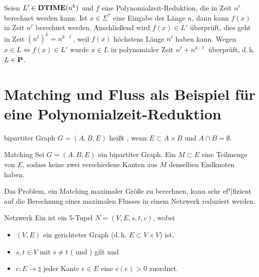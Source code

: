 \begin{Beweis}
    Seien $L' \in \DTIME(n^k)$ und $f$ eine Polynomialzeit-Reduktion, die in
    Zeit $n^\ell$ berechnet werden kann.
    Ist $x \in \Sigma^\ast$ eine Eingabe der Länge $n$, dann
    kann $f(x)$ in Zeit $n^\ell$ berechnet werden.
    Anschließend wird $f(x) \in L'$ überprüft, dies geht in Zeit $(n^\ell)^k = n^{k \cdot \ell}$,
    weil $f(x)$ höchstens Länge $n^\ell$ haben kann.
    Wegen $x \in L \iff f(x) \in L'$ wurde $x \in L$ in
    polynomialer Zeit $n^\ell + n^{k \cdot \ell}$ überprüft, d.\,h. $L \in \P$.
\end{Beweis}

\section{%
    Matching und Fluss als Beispiel für eine Polynomialzeit-Reduktion%
}

\begin{Def}{bipartiter Graph}
    $G = (A, B, E)$ heißt , wenn $E \subset A \times B$
    und $A \cap B = \emptyset$.
\end{Def}

\begin{Def}{Matching}
    Sei $G = (A, B, E)$ ein bipartiter Graph.
    Ein  $M \subset E$ eine Teilmenge von $E$, sodass keine zwei
    verschiedene Kanten aus $M$ denselben Endknoten haben.
\end{Def}

\linie

\begin{Bem}
    Das Problem, ein Matching maximaler Größe zu berechnen,
    kann sehr ef"|fizient auf die Berechnung eines maximalen Flusses in einem Netzwerk
    reduziert werden.
\end{Bem}

\begin{Def}{Netzwerk}
    Ein  ist ein $5$-Tupel $N = (V, E, s, t, c)$, wobei
    \begin{itemize}
        \item
        $(V, E)$ ein gerichteter Graph (d.\,h. $E \subset V \times V$) ist,

        \item
        $s, t \in V$ mit $s \not= t$ ( und ) gilt und

        \item
        $c\colon E \rightarrow \natural$ jeder Kante $e \in E$ eine 
        $c(e) > 0$ zuordnet.
    \end{itemize}
\end{Def}

